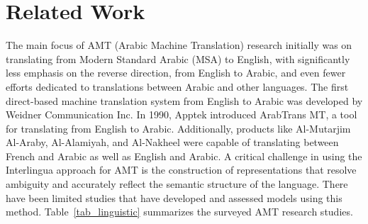 \section{Related Work}
The main focus of AMT (Arabic Machine Translation) research initially was on translating from Modern Standard Arabic (MSA) to English, with significantly less emphasis on the reverse direction, from English to Arabic, and even fewer efforts dedicated to translations between Arabic and other languages. 
The first direct-based machine translation system from English to Arabic was developed by Weidner Communication Inc. In 1990, Apptek introduced ArabTrans MT, a tool for translating from English to Arabic. 
Additionally, products like Al-Mutarjim Al-Araby, Al-Alamiyah, and Al-Nakheel were capable of translating between French and Arabic as well as English and Arabic. 
A critical challenge in using the Interlingua approach for AMT is the construction of representations that resolve ambiguity and accurately reflect the semantic structure of the language. 
There have been limited studies that have developed and assessed models using this method.
Table~\ref{tab_linguistic} summarizes the surveyed AMT research studies.
